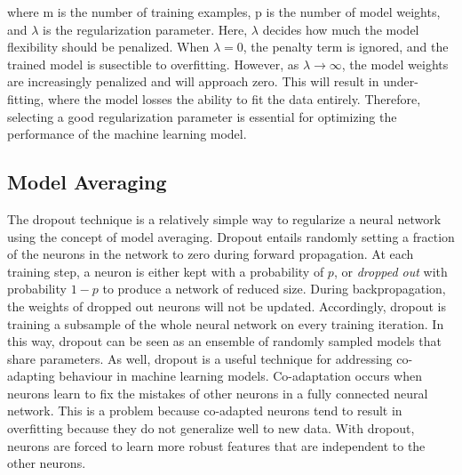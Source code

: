 \noindent
where m is the number of training examples, p is the number of model weights, and $\lambda$ is the regularization parameter. Here, $\lambda$ decides how much the model flexibility should be penalized. When $\lambda = 0$, the penalty term is ignored, and the trained model is susectible to overfitting. However, as $\lambda \rightarrow \infty$, the model weights are increasingly penalized and will approach zero. This will result in under-fitting, where the model losses the ability to fit the data entirely. Therefore, selecting a good regularization parameter is essential for optimizing the performance of the machine learning model. 


\subsection{Model Averaging}

The dropout technique is a relatively simple way to regularize a neural network using the concept of model averaging. Dropout entails randomly setting a fraction of the neurons in the network to zero during forward propagation. At each training step, a neuron is either kept with a probability of $p$, or \textit{dropped out} with probability $1-p$ to produce a network of reduced size. During backpropagation, the weights of dropped out neurons will not be updated. Accordingly, dropout is training a subsample of the whole neural network on every training iteration. In this way, dropout can be seen as an ensemble of randomly sampled models that share parameters. As well, dropout is a useful technique for addressing co-adapting behaviour in machine learning models. Co-adaptation occurs when neurons learn to fix the mistakes of other neurons in a fully connected neural network. This is a problem because co-adapted neurons tend to result in overfitting because they do not generalize well to new data. With dropout, neurons are forced to learn more robust features that are independent to the other neurons. 

